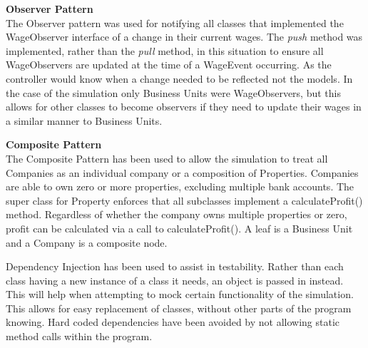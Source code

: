 \documentclass{worksheet}
\begin{document}
	\vspace{0.5cm}
\iffalse
	\break
	\textbf{Model, View, Controller Pattern \\}	
	The MVC Pattern was incorporated for the design of the system's architecture. This allows for a separation of concerns for the system's tasks and flexibility with the components of the system.
	\vspace{0.5cm}
\fi
	\textbf{Observer Pattern \\}
	The Observer pattern was used for notifying all classes that implemented the WageObserver interface of a change in their current wages. The \textit{push} method was implemented, rather than the \textit{pull} method, in this situation to ensure all WageObservers are updated at the time of a WageEvent occurring. As the controller would know when a change needed to be reflected not the models. In the case of the simulation only Business Units were WageObservers, but this allows for other classes to become observers if they need to update their wages in a similar manner to Business Units. 
	\vspace{0.5cm}

	\textbf{Composite Pattern \\}	
	The Composite Pattern has been used to allow the simulation to treat all Companies as an individual company or a composition of Properties.
	Companies are able to own zero or more properties, excluding multiple bank accounts. The super class for Property enforces that all subclasses implement a calculateProfit() method. Regardless of whether the company owns multiple properties or zero, profit can be calculated via a call to calculateProfit(). A leaf is a Business Unit and a Company is a composite node.
	\vspace{0.5cm}
	
	
	

\pagebreak     
     
	Dependency Injection has been used to assist in testability. Rather than each class having a new instance of a class it needs, an object is passed in instead. This will help when attempting to mock certain functionality of the simulation. This allows for easy replacement of classes, without other parts of the program knowing. Hard coded dependencies have been avoided by not allowing static method calls within the program. 
	
\end{document}
